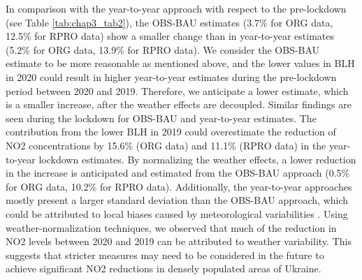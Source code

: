 In comparison with the year-to-year approach with respect to the pre-lockdown (see Table \ref{tab:chap3_tab2}), the OBS-BAU estimates (3.7\% for ORG data, 12.5\% for RPRO data) show a smaller change than in year-to-year estimates (5.2\% for ORG data, 13.9\% for RPRO data). We consider the OBS-BAU estimate to be more reasonable as mentioned above, and the lower values in BLH in 2020 could result in higher year-to-year estimates during the pre-lockdown period between 2020 and 2019. Therefore, we anticipate a lower estimate, which is a smaller increase, after the weather effects are decoupled. Similar findings are seen during the lockdown for OBS-BAU and year-to-year estimates. The contribution from the lower BLH in 2019 could overestimate the reduction of NO2 concentrations by 15.6\% (ORG data) and 11.1\% (RPRO data) in the year-to-year lockdown estimates. By normalizing the weather effects, a lower reduction in the increase is anticipated and estimated from the OBS-BAU approach (0.5\% for ORG data, 10.2\% for RPRO data). Additionally, the year-to-year approaches mostly present a larger standard deviation than the OBS-BAU approach, which could be attributed to local biases caused by meteorological variabilities \citep{barre2021estimating}. Using weather-normalization techniques, we observed that much of the reduction in NO2 levels between 2020 and 2019 can be attributed to weather variability. This suggests that stricter measures may need to be considered in the future to achieve significant NO2 reductions in densely populated areas of Ukraine.\par

